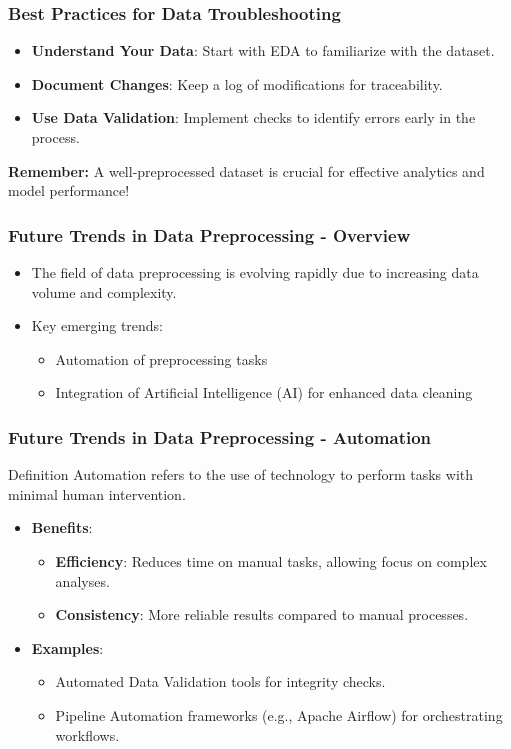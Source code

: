 \documentclass[aspectratio=169]{beamer}
\begin{document}
\begin{frame}
    \frametitle{Best Practices for Data Troubleshooting}
    \begin{itemize}
        \item \textbf{Understand Your Data}: Start with EDA to familiarize with the dataset.
        \item \textbf{Document Changes}: Keep a log of modifications for traceability.
        \item \textbf{Use Data Validation}: Implement checks to identify errors early in the process.
    \end{itemize}

    \textbf{Remember:} A well-preprocessed dataset is crucial for effective analytics and model performance!
\end{frame}

\begin{frame}[fragile]
    \frametitle{Future Trends in Data Preprocessing - Overview}
    \begin{itemize}
        \item The field of data preprocessing is evolving rapidly due to increasing data volume and complexity.
        \item Key emerging trends:
        \begin{itemize}
            \item Automation of preprocessing tasks
            \item Integration of Artificial Intelligence (AI) for enhanced data cleaning
        \end{itemize}
    \end{itemize}
\end{frame}

\begin{frame}[fragile]
    \frametitle{Future Trends in Data Preprocessing - Automation}
    \begin{block}{Definition}
        Automation refers to the use of technology to perform tasks with minimal human intervention.
    \end{block}
    \begin{itemize}
        \item \textbf{Benefits}:
        \begin{itemize}
            \item \textbf{Efficiency}: Reduces time on manual tasks, allowing focus on complex analyses.
            \item \textbf{Consistency}: More reliable results compared to manual processes.
        \end{itemize}
        \item \textbf{Examples}:
        \begin{itemize}
            \item Automated Data Validation tools for integrity checks.
            \item Pipeline Automation frameworks (e.g., Apache Airflow) for orchestrating workflows.
        \end{itemize}
    \end{itemize}
\end{frame}
\end{document}
